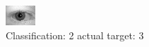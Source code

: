 \begin{figure}[h!]
\begin{center}
\includegraphics[width=0.60\columnwidth]{figures/ID679_class_2_target_3.png}
\end{center}
\caption{ Classification: 2 actual target: 3}
\label{fig:ID679_class_2_target_3}
\end{figure}

